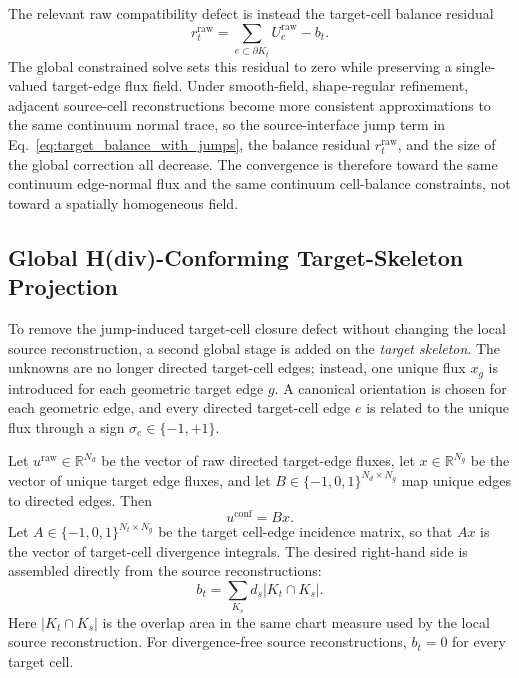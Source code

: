 \documentclass[11pt]{article}
\begin{document}
The relevant raw compatibility defect is instead the target-cell balance
residual
\begin{equation}
  r_t^{\mathrm{raw}}
  =
  \sum_{e\subset\partial K_t} U_e^{\mathrm{raw}} - b_t .
  \label{eq:raw-target-balance-residual}
\end{equation}
The global constrained solve sets this residual to zero while preserving a
single-valued target-edge flux field.  Under smooth-field, shape-regular
refinement, adjacent source-cell reconstructions become more consistent
approximations to the same continuum normal trace, so the source-interface jump
term in Eq.~\eqref{eq:target_balance_with_jumps}, the balance residual
\(r_t^{\mathrm{raw}}\), and the size of the global correction all decrease.
The convergence is therefore toward the same continuum edge-normal flux and the
same continuum cell-balance constraints, not toward a spatially homogeneous
field.

\subsection{Global H(div)-Conforming Target-Skeleton Projection}

To remove the jump-induced target-cell closure defect without changing the local
source reconstruction, a second global stage is added on the \emph{target
skeleton}.  The unknowns are no longer directed target-cell edges; instead, one
unique flux \(x_g\) is introduced for each geometric target edge \(g\).  A
canonical orientation is chosen for each geometric edge, and every directed
target-cell edge \(e\) is related to the unique flux through a sign
\(\sigma_e\in\{-1,+1\}\).

Let \(u^{\mathrm{raw}}\in\mathbb{R}^{N_d}\) be the vector of raw directed
target-edge fluxes, let \(x\in\mathbb{R}^{N_g}\) be the vector of unique target
edge fluxes, and let \(B\in\{-1,0,1\}^{N_d\times N_g}\) map unique edges to
directed edges.  Then
\[
  u^{\mathrm{conf}} = Bx .
\]
Let \(A\in\{-1,0,1\}^{N_t\times N_g}\) be the target cell-edge incidence
matrix, so that \(Ax\) is the vector of target-cell divergence integrals.  The
desired right-hand side is assembled directly from the source reconstructions:
\begin{equation}
  b_t = \sum_{K_s} d_s |K_t \cap K_s| .
  \label{eq:target_divergence_rhs}
\end{equation}
Here \(|K_t \cap K_s|\) is the overlap area in the same chart measure used by
the local source reconstruction.  For divergence-free source reconstructions,
\(b_t=0\) for every target cell.
\end{document}
